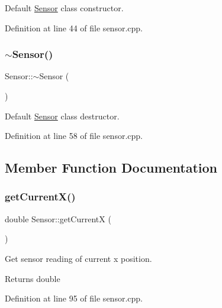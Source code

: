 Default \mbox{\hyperlink{class_sensor}{Sensor}} class constructor. 



Definition at line 44 of file sensor.\+cpp.

\mbox{\label{class_sensor_aee8c70e7ef05ce65e7ee33686b5d7db2}} 
\subsubsection{\texorpdfstring{$\sim$\+Sensor()}{~Sensor()}}
{\footnotesize\ttfamily Sensor\+::$\sim$\+Sensor (\begin{DoxyParamCaption}{ }\end{DoxyParamCaption})}



Default \mbox{\hyperlink{class_sensor}{Sensor}} class destructor. 



Definition at line 58 of file sensor.\+cpp.



\subsection{Member Function Documentation}
\mbox{\label{class_sensor_a933dfb180d498c41862b5e14675cc97d}} 
\subsubsection{\texorpdfstring{get\+Current\+X()}{getCurrentX()}}
{\footnotesize\ttfamily double Sensor\+::get\+CurrentX (\begin{DoxyParamCaption}{ }\end{DoxyParamCaption})}



Get sensor reading of current x position. 

\begin{DoxyReturn}{Returns}
double 
\end{DoxyReturn}


Definition at line 95 of file sensor.\+cpp.

\mbox{\label{class_sensor_a1984ff9826d1c92d7e91add776a4107b}} 

